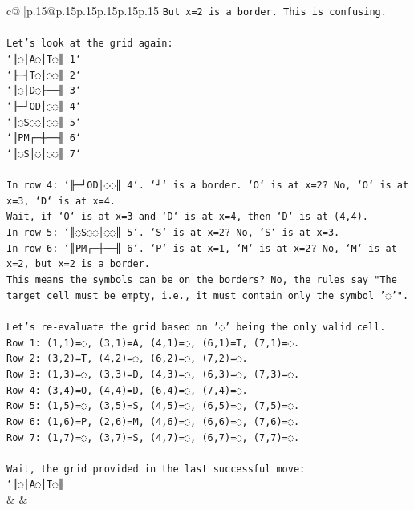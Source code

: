 \documentclass{article}
\begin{document}
{\begin{supertabular}{c@{$\;$}|p{.15\linewidth}@{}p{.15\linewidth}p{.15\linewidth}p{.15\linewidth}p{.15\linewidth}p{.15\linewidth}}
{{{\texttt{But x=2 is a border. This is confusing.} \\
\\ 
\texttt{Let's look at the grid again:} \\
\texttt{`║◌│A◌│T◌║ 1`} \\
\texttt{`╟─┤T◌│◌◌║ 2`} \\
\texttt{`║◌│D◌├──╢ 3`} \\
\texttt{`╟─┘OD│◌◌║ 4`} \\
\texttt{`║◌S◌◌│◌◌║ 5`} \\
\texttt{`║PM┌─┼──╢ 6`} \\
\texttt{`║◌S│◌│◌◌║ 7`} \\
\\ 
\texttt{In row 4: `╟─┘OD│◌◌║ 4`. `┘` is a border. `O` is at x=2? No, `O` is at x=3, `D` is at x=4.} \\
\texttt{Wait, if `O` is at x=3 and `D` is at x=4, then `D` is at (4,4).} \\
\texttt{In row 5: `║◌S◌◌│◌◌║ 5`. `S` is at x=2? No, `S` is at x=3.} \\
\texttt{In row 6: `║PM┌─┼──╢ 6`. `P` is at x=1, `M` is at x=2? No, `M` is at x=2, but x=2 is a border.} \\
\texttt{This means the symbols can be on the borders? No, the rules say "The target cell must be empty, i.e., it must contain only the symbol '◌'".} \\
\\ 
\texttt{Let's re{-}evaluate the grid based on '◌' being the only valid cell.} \\
\texttt{Row 1: (1,1)=◌, (3,1)=A, (4,1)=◌, (6,1)=T, (7,1)=◌.} \\
\texttt{Row 2: (3,2)=T, (4,2)=◌, (6,2)=◌, (7,2)=◌.} \\
\texttt{Row 3: (1,3)=◌, (3,3)=D, (4,3)=◌, (6,3)=◌, (7,3)=◌.} \\
\texttt{Row 4: (3,4)=O, (4,4)=D, (6,4)=◌, (7,4)=◌.} \\
\texttt{Row 5: (1,5)=◌, (3,5)=S, (4,5)=◌, (6,5)=◌, (7,5)=◌.} \\
\texttt{Row 6: (1,6)=P, (2,6)=M, (4,6)=◌, (6,6)=◌, (7,6)=◌.} \\
\texttt{Row 7: (1,7)=◌, (3,7)=S, (4,7)=◌, (6,7)=◌, (7,7)=◌.} \\
\\ 
\texttt{Wait, the grid provided in the last successful move:} \\
\texttt{`║◌│A◌│T◌║} \\
            }
        }
    }
    & & \\ \\


\end{supertabular}}
\end{document}
